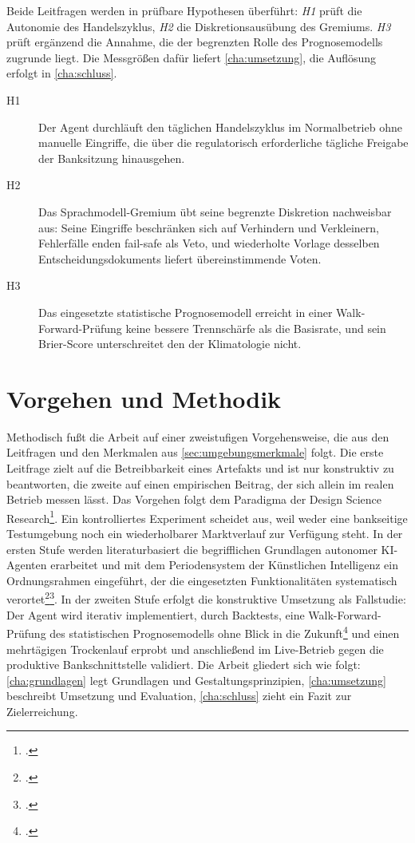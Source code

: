 Beide Leitfragen werden in prüfbare Hypothesen überführt: \emph{H1} prüft die Autonomie des Handelszyklus, \emph{H2} die Diskretionsausübung des Gremiums. \emph{H3} prüft ergänzend die Annahme, die der begrenzten Rolle des Prognosemodells zugrunde liegt. Die Messgrößen dafür liefert \cref{cha:umsetzung}, die Auflösung erfolgt in \cref{cha:schluss}.

\begin{description}
  \item[H1] Der Agent durchläuft den täglichen Handelszyklus im Normalbetrieb ohne
    manuelle Eingriffe, die über die regulatorisch erforderliche tägliche Freigabe der
    Banksitzung hinausgehen.
  \item[H2] Das Sprachmodell-Gremium übt seine begrenzte Diskretion nachweisbar aus: Seine Eingriffe beschränken sich auf Verhindern und Verkleinern, Fehlerfälle enden fail-safe als Veto, und wiederholte Vorlage desselben Entscheidungsdokuments liefert übereinstimmende Voten.
  \item[H3] Das eingesetzte statistische Prognosemodell erreicht in einer Walk-Forward-Prüfung keine bessere Trennschärfe als die Basisrate, und sein Brier-Score unterschreitet den der Klimatologie nicht.
\end{description}

\section{Vorgehen und Methodik}
\label{sec:methodik}

Methodisch fußt die Arbeit auf einer zweistufigen Vorgehensweise, die aus den Leitfragen und den Merkmalen aus \cref{sec:umgebungsmerkmale} folgt. Die
erste Leitfrage zielt auf die Betreibbarkeit eines Artefakts und ist nur konstruktiv zu
beantworten, die zweite auf einen empirischen Beitrag, der sich allein im realen
Betrieb messen lässt. Das Vorgehen folgt dem Paradigma der Design Science Research\footcite[vgl.][S.~75--105]{hevner2004}. Ein kontrolliertes Experiment scheidet aus, weil weder eine
bankseitige Testumgebung noch ein wiederholbarer Marktverlauf zur Verfügung steht. In der ersten Stufe
werden literaturbasiert die begrifflichen Grundlagen autonomer
KI-Agenten erarbeitet und mit dem Periodensystem der Künstlichen Intelligenz ein
Ordnungsrahmen eingeführt, der die eingesetzten Funktionalitäten systematisch
verortet\footcite[vgl.][S.~15, 18]{bitkom2018}\footcite[Ursprungsbeitrag der zugrunde liegenden Idee, vgl.][]{hammond2016}.
In der zweiten Stufe erfolgt die konstruktive Umsetzung als Fallstudie: Der Agent wird
iterativ implementiert, durch Backtests, eine Walk-Forward-Prüfung des statistischen
Prognosemodells ohne Blick in die Zukunft\footcite[vgl.][Kap.~11]{pardo2008} und einen
mehrtägigen Trockenlauf erprobt und anschließend im Live-Betrieb gegen die produktive Bankschnittstelle
validiert. Die Arbeit gliedert sich wie folgt: \cref{cha:grundlagen} legt Grundlagen und
Gestaltungsprinzipien, \cref{cha:umsetzung} beschreibt Umsetzung und Evaluation,
\cref{cha:schluss} zieht ein Fazit zur Zielerreichung.

